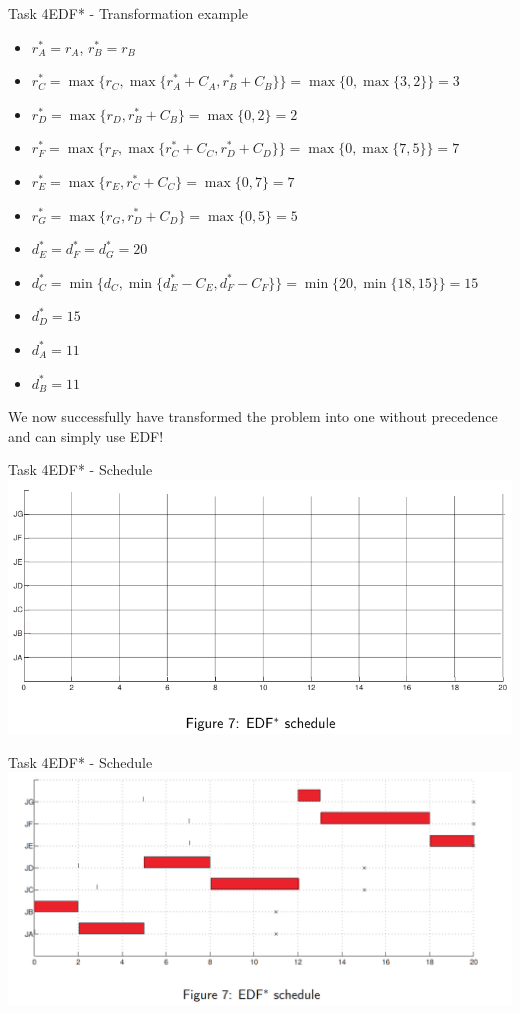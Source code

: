 \begin{frame}[allowframebreaks]{Task 4}{EDF* - Transformation example}
    \begin{itemize}
        \item $r_A^* = r_A$, $r_B^* = r_B$
        \item $r_C^* = \max\{r_C,\max\{r_A^* + C_A, r_B^* + C_B\}\} = \max\{0, \max\{3, 2\}\} = 3$
        \item $r_D^* = \max\{r_D,r_B^* + C_B\} = \max\{0, 2\} = 2$
        \item $r_F^* = \max\{r_F,\max\{r_C^* + C_C, r_D^* + C_D\}\} = \max\{0, \max\{7, 5\}\} = 7$
        \item $r_E^* = \max\{r_E,r_C^* + C_C\} = \max\{0, 7\} = 7$
        \item $r_G^* = \max\{r_G,r_D^* + C_D\} = \max\{0, 5\} = 5$
    \end{itemize}
    \framebreak
    \begin{itemize}
        \item $d_E^* = d_F^* = d_G^* = 20$
        \item $d_C^* = \min\{d_C, \min\{d_E^* - C_E, d_F^* - C_F\}\} = \min\{20, \min\{18, 15\}\} = 15$
        \item $d_D^* = 15$
        \item $d_A^* = 11$
        \item $d_B^* = 11$
    \end{itemize}
    We now successfully have transformed the problem into one without precedence and can simply use EDF!
\end{frame}
\begin{frame}{Task 4}{EDF* - Schedule}
    \includegraphics[width = 0.9\linewidth]{figures/EDF-star-schedule.png}
\end{frame}

\begin{frame}{Task 4}{EDF* - Schedule}
    \includegraphics[width = \linewidth]{figures/edf-star-schedule-2.PNG}
\end{frame}